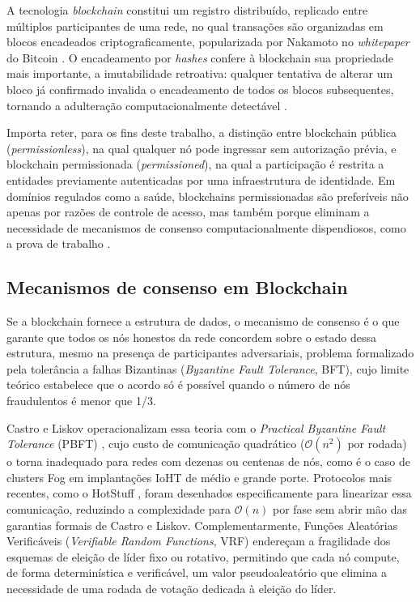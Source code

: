\documentclass[12pt]{article}
\begin{document}
A tecnologia \textit{blockchain} constitui um registro distribuído, replicado entre múltiplos participantes de uma rede, no qual transações são organizadas em blocos encadeados criptograficamente, popularizada por Nakamoto no \textit{whitepaper} do Bitcoin \cite{nakamoto2008bitcoin}. O encadeamento por \textit{hashes} confere à blockchain sua propriedade mais importante, a imutabilidade retroativa: qualquer tentativa de alterar um bloco já confirmado invalida o encadeamento de todos os blocos subsequentes, tornando a adulteração computacionalmente detectável \cite{qammar2023securing}.

Importa reter, para os fins deste trabalho, a distinção entre blockchain pública (\textit{permissionless}), na qual qualquer nó pode ingressar sem autorização prévia, e blockchain permissionada (\textit{permissioned}), na qual a participação é restrita a entidades previamente autenticadas por uma infraestrutura de identidade. Em domínios regulados como a saúde, blockchains permissionadas são preferíveis não apenas por razões de controle de acesso, mas também porque eliminam a necessidade de mecanismos de consenso computacionalmente dispendiosos, como a prova de trabalho \cite{wu2024scalable}.

\subsection{Mecanismos de consenso em Blockchain}

Se a blockchain fornece a estrutura de dados, o mecanismo de consenso é o que garante que todos os nós honestos da rede concordem sobre o estado dessa estrutura, mesmo na presença de participantes adversariais, problema formalizado pela tolerância a falhas Bizantinas (\textit{Byzantine Fault Tolerance}, BFT), cujo limite teórico estabelece que o acordo só é possível quando o número de nós fraudulentos é menor que 1/3.

Castro e Liskov operacionalizam essa teoria com o \textit{Practical Byzantine Fault Tolerance} (PBFT) \cite{castro1999practical}, cujo custo de comunicação quadrático ($\mathcal{O}(n^2)$ por rodada) o torna inadequado para redes com dezenas ou centenas de nós, como é o caso de clusters Fog em implantações IoHT de médio e grande porte. Protocolos mais recentes, como o HotStuff \cite{yin2019hotstuff}, foram desenhados especificamente para linearizar essa comunicação, reduzindo a complexidade para $\mathcal{O}(n)$ por fase sem abrir mão das garantias formais de Castro e Liskov. Complementarmente, Funções Aleatórias Verificáveis (\textit{Verifiable Random Functions}, VRF) \cite{micali1999verifiable} endereçam a fragilidade dos esquemas de eleição de líder fixo ou rotativo, permitindo que cada nó compute, de forma determinística e verificável, um valor pseudoaleatório que elimina a necessidade de uma rodada de votação dedicada à eleição do líder.
\end{document}
